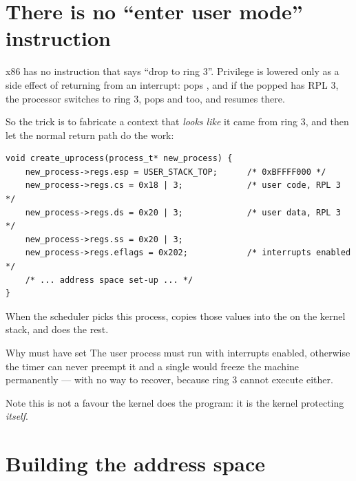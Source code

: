 \section{There is no ``enter user mode'' instruction}

x86 has no instruction that says ``drop to ring 3''. Privilege is lowered only as a side effect of
returning from an interrupt:  pops , and if the popped  has RPL 3, the
processor switches to ring 3, pops  and  too, and resumes there.

So the trick is to fabricate a context that \emph{looks like} it came from ring 3, and then let the
normal return path do the work:

\begin{lstlisting}[style=c]
void create_uprocess(process_t* new_process) {
    new_process->regs.esp = USER_STACK_TOP;      /* 0xBFFFF000 */
    new_process->regs.cs = 0x18 | 3;             /* user code, RPL 3 */
    new_process->regs.ds = 0x20 | 3;             /* user data, RPL 3 */
    new_process->regs.ss = 0x20 | 3;
    new_process->regs.eflags = 0x202;            /* interrupts enabled */
    /* ... address space set-up ... */
}
\end{lstlisting}

When the scheduler picks this process,  copies those values into the
 on the kernel stack, and  does the rest. 

\begin{concept}{Why  must have  set}
The user process must run with interrupts enabled, otherwise the timer can never preempt it and a
single  would freeze the machine permanently --- with no way to recover, because
ring 3 cannot execute  either.

Note this is not a favour the kernel does the program: it is the kernel protecting \emph{itself}.
\end{concept}

\section{Building the address space}

